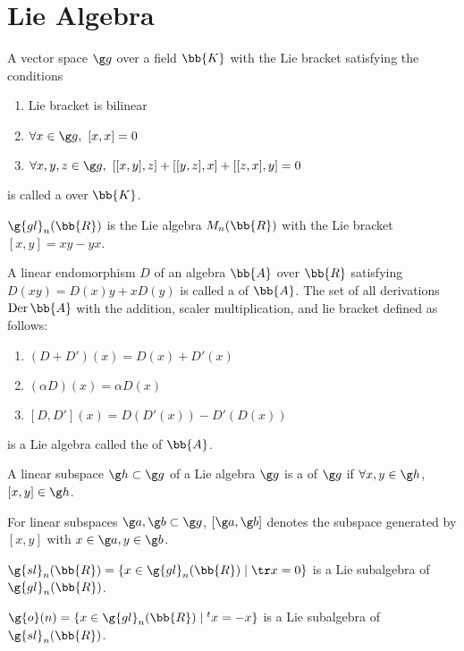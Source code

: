 \newcommand{\gl}{\g{gl}}
\renewcommand{\sl}{\g{sl}}
\renewcommand{\o}{\g{o}}
\section{Lie Algebra\cite{samu}}
A vector space $\g g$ over a field $\bb{K}$ with the Lie bracket satisfying the conditions
\begin{enumerate}
\item Lie bracket is bilinear
\item $\forall x \in \g g,\ [x,x] = 0$
\item $\forall x, y, z \in \g g,\ [[x,y],z]+[[y,z],x]+[[z,x],y] = 0$
\end{enumerate}
is called a  over $\bb{K}$.

$\g{gl}_n(\bb{R})$ is the Lie algebra $M_n(\bb{R})$ with the Lie bracket $[x,y] = xy - yx$.

A linear endomorphism $D$ of an algebra $\bb{A}$ over $\bb{R}$ satisfying $D(xy) = D(x)y + xD(y)$ is called a  of $\bb{A}$. The set of all derivations $\mathrm{Der}\, \bb{A}$ with the addition, scaler multiplication, and lie bracket defined as follows:
\begin{enumerate}
\item $(D+D')(x) = D(x)+D'(x)$
\item $(\alpha D)(x) = \alpha D(x)$
\item $[D,D'](x) = D(D'(x)) - D'(D(x))$
\end{enumerate}
is a Lie algebra called the  of $\bb{A}$.

A linear subspace $\g h \subset \g g$ of a Lie algebra $\g g$ is a  of $\g g$ if $\forall x, y \in \g h$, $[x,y] \in \g h$.

For linear subspaces $\g a, \g b \subset \g g$, $[\g a, \g b]$ denotes the subspace generated by $[x,y]$ with $x \in \g a, y \in \g b$.

$\sl_n(\bb{R}) = \{ x \in \gl_n(\bb{R}) \mid \tr x = 0 \} $ is a Lie subalgebra of $\gl_n(\bb{R})$.

$\o(n) = \{ x \in \gl_n(\bb{R}) \mid {}^tx = -x \}$ is a Lie subalgebra of $\sl_n(\bb{R})$.

